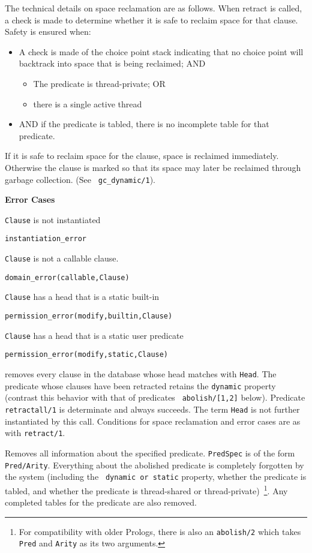 \begin{description}
The technical details on space reclamation are as follows.  When
retract is called, a check is made to determine whether it is safe to
reclaim space for that clause.  Safety is ensured when:
\begin{itemize}
\item A check is made of the choice point stack indicating that no
  choice point will backtrack into space that is being reclaimed; AND
\begin{itemize}
\item The predicate is thread-private; OR 
\item there is a single active thread
\end{itemize}
\item AND if the predicate is tabled, there is no incomplete table
     for that predicate.
\end{itemize}
If it is safe to reclaim space for the clause, space is reclaimed
immediately.  Otherwise the clause is marked so that its space may
later be reclaimed through garbage collection.  (See {\tt
  gc\_dynamic/1}).

{\bf Error Cases}
\bi
\item 	{\tt Clause} is not instantiated
\bi
\item 	{\tt instantiation\_error}
\ei
%
\item 	{\tt Clause} is not a callable clause.
\bi
\item 	{\tt domain\_error(callable,Clause)}
\ei
%
\item 	{\tt Clause} has a head that is a static built-in
\bi
\item 	{\tt permission\_error(modify,builtin,Clause)}
\ei
\item 	{\tt Clause} has a head that is a static user predicate
\bi
\item 	{\tt permission\_error(modify,static,Clause)}
\ei
%
\ei

 removes every
clause in the database whose head matches with {\tt Head}.  The
predicate whose clauses have been retracted retains the {\tt dynamic}
property (contrast this behavior with that of predicates {\tt
  abolish/[1,2]} below).  Predicate {\tt retractall/1} is determinate
and always succeeds.  The term {\tt Head} is not further instantiated
by this call.  Conditions for space reclamation and error cases are as
with {\tt retract/1}.

%
Removes all information about the specified predicate. {\tt PredSpec}
is of the form {\tt Pred/Arity}.  Everything about the abolished
predicate is completely forgotten by the system (including the {\tt
  dynamic or static} property, whether the predicate is tabled, and
whether the predicate is thread-shared or
thread-private)~\footnote{For compatibility with older Prologs, there
  is also an {\tt abolish/2} which takes {\tt Pred} and {\tt Arity} as
  its two arguments.}.  Any completed tables for the predicate are
also removed.


\end{description}
